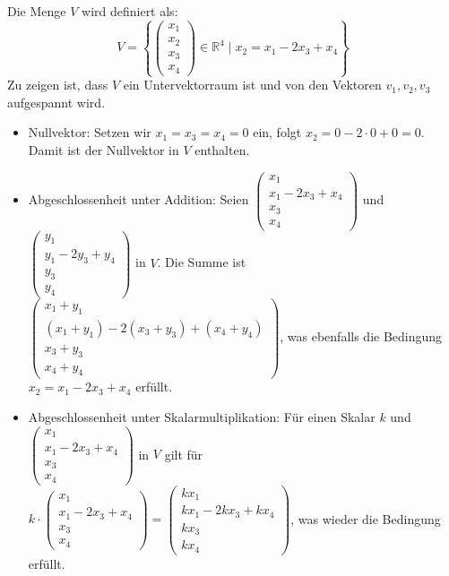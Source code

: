 \documentclass[a4paper]{scrartcl}
\begin{document}
Die Menge $V$ wird definiert als:
\[ V = \left\{ \begin{pmatrix} x_1 \\ x_2 \\ x_3 \\ x_4 \end{pmatrix} \in \mathbb{R}^4 \mid x_2 = x_1 - 2x_3 + x_4 \right\} \]
Zu zeigen ist, dass $V$ ein Untervektorraum ist und von den Vektoren $v_1, v_2, v_3$ aufgespannt wird.
\begin{itemize}
    \item Nullvektor: Setzen wir $x_1 = x_3 = x_4 = 0$ ein, folgt $x_2 = 0 - 2\cdot0 + 0 = 0$. Damit ist der Nullvektor in $V$ enthalten.
    
    \item Abgeschlossenheit unter Addition: Seien $\begin{pmatrix} x_1 \\ x_1 - 2x_3 + x_4 \\ x_3 \\ x_4 \end{pmatrix}$ und $\begin{pmatrix} y_1 \\ y_1 - 2y_3 + y_4 \\ y_3 \\ y_4 \end{pmatrix}$ in $V$. Die Summe ist $\begin{pmatrix} x_1 + y_1 \\ (x_1 + y_1) - 2(x_3 + y_3) + (x_4 + y_4) \\ x_3 + y_3 \\ x_4 + y_4 \end{pmatrix}$, was ebenfalls die Bedingung $x_2 = x_1 - 2x_3 + x_4$ erfüllt.
    
    \item Abgeschlossenheit unter Skalarmultiplikation: Für einen Skalar $k$ und $\begin{pmatrix} x_1 \\ x_1 - 2x_3 + x_4 \\ x_3 \\ x_4 \end{pmatrix}$ in $V$ gilt für $k \cdot \begin{pmatrix} x_1 \\ x_1 - 2x_3 + x_4 \\ x_3 \\ x_4 \end{pmatrix} = \begin{pmatrix} kx_1 \\ kx_1 - 2kx_3 + kx_4 \\ kx_3 \\ kx_4 \end{pmatrix}$, was wieder die Bedingung erfüllt.
\end{itemize}
\end{document}
